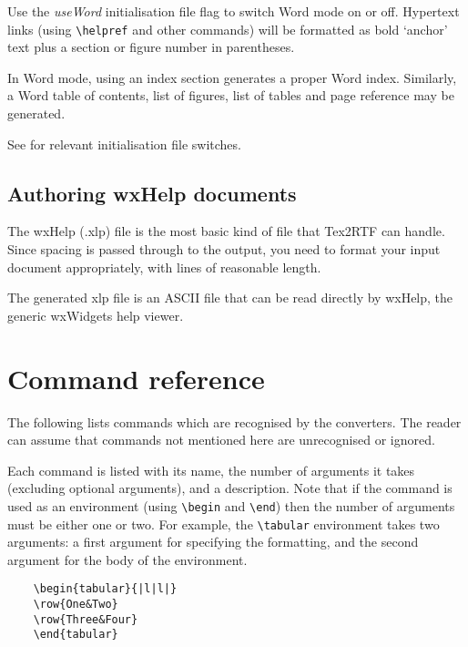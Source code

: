 Use the {\it useWord} initialisation file flag to switch Word mode
on or off.
Hypertext links (using \verb$\helpref$ and other commands) will be formatted as
bold `anchor' text plus a section or figure number in parentheses.

In Word mode, using an index section generates a proper Word index.
Similarly, a Word table of contents, list of figures, list of tables
and page reference may be generated.

See  for
relevant initialisation file switches.

\section{Authoring wxHelp documents}%

The wxHelp (.xlp) file is the most basic kind of file that Tex2RTF
can handle. Since spacing is passed through to the output, you need to
format your input document appropriately, with lines of reasonable length.

The generated xlp file is an ASCII file that can be read directly by
wxHelp, the generic wxWidgets help viewer.

\chapter{Command reference}%
%
\setfooter{\thepage}{}{}{}{}{\thepage}%

The following lists commands which are recognised by the converters. The reader
can assume that commands not mentioned here are unrecognised or ignored.

Each command is listed with its name, the number of arguments it takes
(excluding optional arguments), and a description. Note that if the
command is used as an environment (using \verb$\begin$ and \verb$\end$) then
the number of arguments must be either one or two. For example, the\rtfsp
\verb$\tabular$ environment takes two arguments: a first argument for
specifying the formatting, and the second argument for the body of the
environment.

\begin{verbatim}
    \begin{tabular}{|l|l|}
    \row{One&Two}
    \row{Three&Four}
    \end{tabular}
\end{verbatim}

